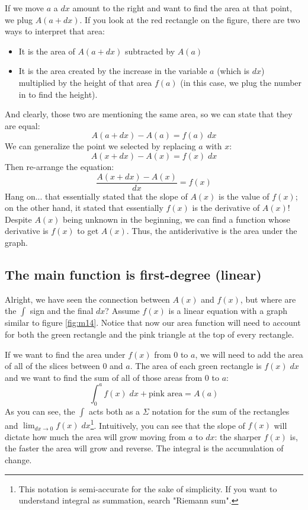 If we move $a$ a $dx$ amount to the right and want to find the area at that point, we plug $A(a+dx)$. If you look at the red rectangle on the figure, there are two ways to interpret that area:
\begin{itemize}
    \item It is the area of $A(a+dx)$ subtracted by $A(a)$
    \item It is the area created by the increase in the variable $a$ (which is $dx$) multiplied by the height of that area $f(a)$ (in this case, we plug the number in to find the height).
\end{itemize}
And clearly, those two are mentioning the same area, so we can state that they are equal:
\[
    A(a+dx)-A(a)
    = f(a) \;dx
\]
We can generalize the point we selected by replacing $a$ with $x$:
\[
    A(x+dx)-A(x)
    = f(x) \;dx
\]
Then re-arrange the equation:
\[
    \frac{A(x+dx)-A(x)}{dx}
    = f(x)
\]
Hang on... that essentially stated that the slope of $A(x)$ is the value of $f(x)$; on the other hand, it stated that essentially $f(x)$ is the derivative of $A(x)$! Despite $A(x)$ being unknown in the beginning, we can find a function whose derivative is $f(x)$ to get $A(x)$. Thus, the antiderivative is the area under the graph.

\subsection{The main function is first-degree (linear)}
Alright, we have seen the connection between $A(x)$ and $f(x)$, but where are the $\int$ sign and the final $dx$? Assume $f(x)$ is a linear equation with a graph similar to figure \ref{fig:m14}. Notice that now our area function will need to account for both the green rectangle and the pink triangle at the top of every rectangle.

If we want to find the area under $f(x)$ from $0$ to $a$, we will need to add the area of all of the slices between $0$ and $a$. The area of each green rectangle is $f(x) \;dx$ and we want to find the sum of all of those areas from $0$ to $a$:
\[
    \int^a_0 f(x) \;dx + \text{pink area}
    = A(a)
\]
As you can see, the $\int$ acts both as a $\Sigma$ notation for the sum of the rectangles and $\lim_{dx\to0} f(x)\;dx$\footnote{This notation is semi-accurate for the sake of simplicity. If you want to understand integral as summation, search "Riemann sum".}. Intuitively, you can see that the slope of $f(x)$ will dictate how much the area will grow moving from $a$ to $dx$: the sharper $f(x)$ is, the faster the area will grow and reverse. The integral is the accumulation of change.

